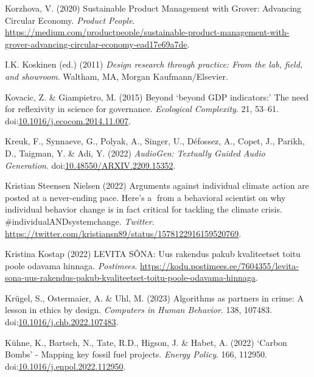 \documentclass[
  letterpaper,
  DIV=11,
  numbers=noendperiod]{scrartcl}
\newlength{\cslhangindent}
\newenvironment{CSLReferences}[2] %
 {\begin{list}{}{%
  \setlength{\itemindent}{0pt}
  \setlength{\leftmargin}{0pt}
  \setlength{\parsep}{0pt}
  \ifodd #1
   \setlength{\leftmargin}{\cslhangindent}
   \setlength{\itemindent}{-1\cslhangindent}
  \fi
  \setlength{\itemsep}{#2\baselineskip}}}
 {\end{list}}
\begin{document}
\begin{CSLReferences}{0}{1}
Korzhova, V. (2020) Sustainable {Product Management} with {Grover}:
{Advancing Circular Economy}. \emph{Product People}.
\url{https://medium.com/productpeople/sustainable-product-management-with-grover-advancing-circular-economy-ead17e69a7de}.

I.K. Koskinen (ed.) (2011) \emph{Design research through practice: From
the lab, field, and showroom}. Waltham, MA, Morgan Kaufmann/Elsevier.

Kovacic, Z. \& Giampietro, M. (2015) Beyond {`beyond {GDP} indicators:'}
{The} need for reflexivity in science for governance. \emph{Ecological
Complexity}. 21, 53--61.
doi:\href{https://doi.org/10.1016/j.ecocom.2014.11.007}{10.1016/j.ecocom.2014.11.007}.

Kreuk, F., Synnaeve, G., Polyak, A., Singer, U., Défossez, A., Copet,
J., Parikh, D., Taigman, Y. \& Adi, Y. (2022) \emph{{AudioGen}:
{Textually Guided Audio Generation}}.
doi:\href{https://doi.org/10.48550/ARXIV.2209.15352}{10.48550/ARXIV.2209.15352}.

Kristian Steensen Nielsen (2022) Arguments against individual climate
action are posted at a never-ending pace. {Here}'s a 🧵from a behavioral
scientist on why individual behavior change is in fact critical for
tackling the climate crisis. \#{individualANDsystemchange}.
\emph{Twitter}.
\url{https://twitter.com/kristiansn89/status/1578122916159520769}.

Kristina Kostap (2022) {LEVITA S{Õ}NA: Uus rakendus pakub kvaliteetset
toitu poole odavama hinnaga}. \emph{Postimees}.
\url{https://kodu.postimees.ee/7604355/levita-sona-uus-rakendus-pakub-kvaliteetset-toitu-poole-odavama-hinnaga}.

Krügel, S., Ostermaier, A. \& Uhl, M. (2023) Algorithms as partners in
crime: {A} lesson in ethics by design. \emph{Computers in Human
Behavior}. 138, 107483.
doi:\href{https://doi.org/10.1016/j.chb.2022.107483}{10.1016/j.chb.2022.107483}.

Kühne, K., Bartsch, N., Tate, R.D., Higson, J. \& Habet, A. (2022)
{`{Carbon Bombs}'} - {Mapping} key fossil fuel projects. \emph{Energy
Policy}. 166, 112950.
doi:\href{https://doi.org/10.1016/j.enpol.2022.112950}{10.1016/j.enpol.2022.112950}.


\end{CSLReferences}
\end{document}
